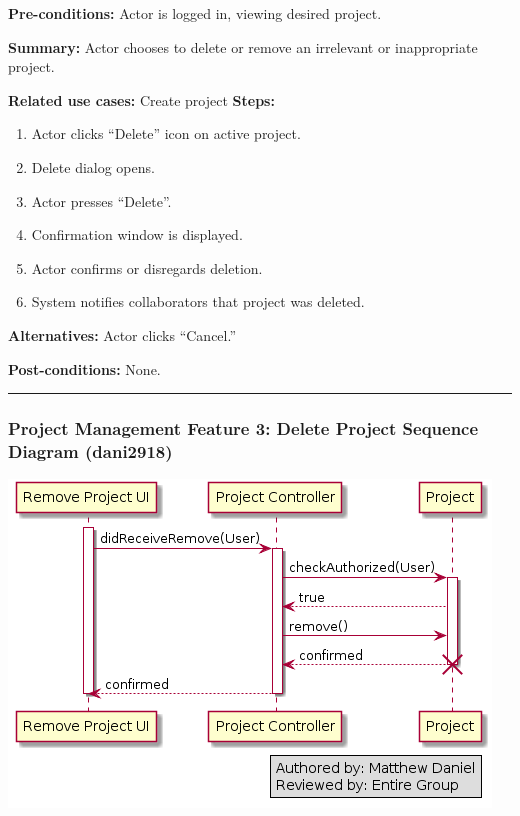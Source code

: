 \documentclass[twoside,letterpaper]{article}
\begin{document}
 \noindent  \textbf{Pre-conditions:} Actor is logged in, viewing desired project.  \newline
 
 \noindent \textbf{Summary:} Actor chooses to delete or remove an irrelevant or inappropriate project.  \newline
 
 \noindent \textbf{Related use cases:} Create project\newline
\textbf{Steps:} \begin{enumerate}
  \item Actor clicks ``Delete'' icon on active project.
  \item Delete dialog opens.
  \item Actor presses ``Delete''.
  \item Confirmation window is displayed.
  \item Actor confirms or disregards deletion.
  \item System notifies collaborators that project was deleted.
 \end{enumerate}
 \textbf{Alternatives:} Actor clicks ``Cancel.'' \newline
 
 \noindent  \textbf{Post-conditions:} None. \newline
\vspace{8pt}
\hrule

\newpage

\subsubsection[Project Management Feature 3: Delete Project Sequence Diagram (dani2918)]{\rmfamily\bfseries\color{black}
	Project Management Feature 3: Delete Project Sequence Diagram  (dani2918)}

\bigskip

\includegraphics[width=\textwidth]{images/SequenceDiagrams/PMDeleteProject}
\end{document}
